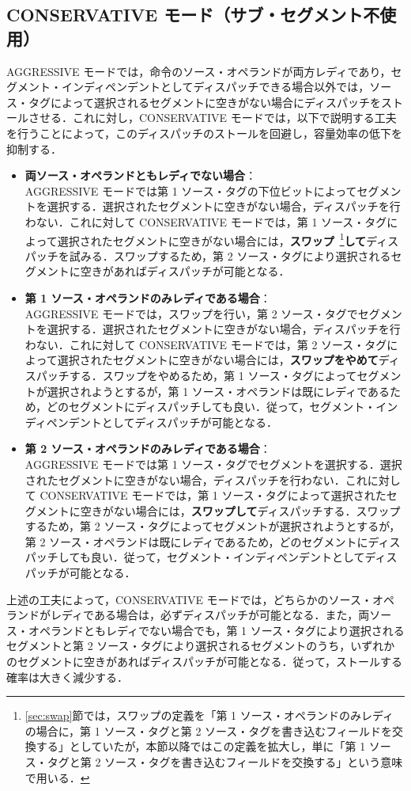 \subsection{CONSERVATIVE モード（サブ・セグメント不使用）}
AGGRESSIVE モードでは，命令のソース・オペランドが両方レディであり，セグメント・インディペンデントとしてディスパッチできる場合以外では，ソース・タグによって選択されるセグメントに空きがない場合にディスパッチをストールさせる．これに対し，CONSERVATIVE モードでは，以下で説明する工夫を行うことによって，このディスパッチのストールを回避し，容量効率の低下を抑制する．
\begin{itemize}
  \item \textbf{両ソース・オペランドともレディでない場合}：\\AGGRESSIVE モードでは第 1 ソース・タグの下位ビットによってセグメントを選択する．選択されたセグメントに空きがない場合，ディスパッチを行わない．これに対して CONSERVATIVE モードでは，第 1 ソース・タグによって選択されたセグメントに空きがない場合には，\textbf{スワップ}~\footnote{\ref{sec:swap}節では，スワップの定義を「第 1 ソース・オペランドのみレディの場合に，第 1 ソース・タグと第 2 ソース・タグを書き込むフィールドを交換する」としていたが，本節以降ではこの定義を拡大し，単に「第 1 ソース・タグと第 2 ソース・タグを書き込むフィールドを交換する」という意味で用いる．}\textbf{して}ディスパッチを試みる．スワップするため，第 2 ソース・タグにより選択されるセグメントに空きがあればディスパッチが可能となる．
  \item \textbf{第 1 ソース・オペランドのみレディである場合}：\\AGGRESSIVE モードでは，スワップを行い，第 2 ソース・タグでセグメントを選択する．選択されたセグメントに空きがない場合，ディスパッチを行わない．これに対して CONSERVATIVE モードでは，第 2 ソース・タグによって選択されたセグメントに空きがない場合には，\textbf{スワップをやめて}ディスパッチする．スワップをやめるため，第 1 ソース・タグによってセグメントが選択されようとするが，第 1 ソース・オペランドは既にレディであるため，どのセグメントにディスパッチしても良い．従って，セグメント・インディペンデントとしてディスパッチが可能となる．
  \item \textbf{第 2 ソース・オペランドのみレディである場合}：\\AGGRESSIVE モードでは第 1 ソース・タグでセグメントを選択する．選択されたセグメントに空きがない場合，ディスパッチを行わない．これに対して CONSERVATIVE モードでは，第 1 ソース・タグによって選択されたセグメントに空きがない場合には，\textbf{スワップして}ディスパッチする．スワップするため，第 2 ソース・タグによってセグメントが選択されようとするが，第 2 ソース・オペランドは既にレディであるため，どのセグメントにディスパッチしても良い．従って，セグメント・インディペンデントとしてディスパッチが可能となる．
\end{itemize}
上述の工夫によって，CONSERVATIVE モードでは，どちらかのソース・オペランドがレディである場合は，必ずディスパッチが可能となる．また，両ソース・オペランドともレディでない場合でも，第 1 ソース・タグにより選択されるセグメントと第 2 ソース・タグにより選択されるセグメントのうち，いずれかのセグメントに空きがあればディスパッチが可能となる．従って，ストールする確率は大きく減少する．

